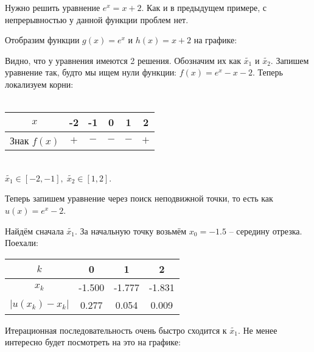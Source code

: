 \documentclass[../main.tex]{subfile}
\begin{document}
\begin{example}
	Нужно решить уравнение \(e^x=x+2.\) Как и в предыдущем примере, с
	непрерывностью у данной функции проблем нет.
	\newpage

	Отобразим функции $g(x)=e^x$ и $h(x)=x+2$ на графике:

	{\makeatletter
	\let\par\@@par
	\par{}
	\everypar{}
	\begin{wrapfigure}{l}{0.45\textwidth}
		
	\end{wrapfigure}

	Видно, что у уравнения имеются 2 решения. Обозначим их как
	$\widetilde{x_1}$ и $\widetilde{x_2}$. Запишем уравнение так, будто мы
	ищем нули функции: $f(x) = e^x-x-2$. Теперь локализуем корни:\\\\
	\begin{tabular}{ *{6}{|c}| }
		\hline
		$x$		& -2	& -1	& 0	& 1	& 2 \\
		\hline
		Знак $f(x)$ 	& $+$	& $-$	& $-$	& $-$ 	& $+$\\
		\hline
	\end{tabular}
	\\

	$\widetilde{x_1}\in[-2,-1],\;\widetilde{x_2}\in[1,2]$.

	Теперь запишем уравнение через поиск неподвижной точки, то есть как
	$u(x)=e^x-2$.
	\par}


	Найдём сначала $\widetilde{x_1}$. За начальную точку возьмём $x_0=-1.5$ --
	середину отрезка. Поехали:

	\begin{tabular}{*{4}{|c}|}
		\hline
		$k$		& 0	& 1	& 2	\\
		\hline
		$x_k$		&-1.500	&-1.777	&-1.831	\\
		\hline
		$|u(x_k)-x_k|$	& 0.277	& 0.054	& 0.009	\\
		\hline
	\end{tabular}
	\newline

	Итерационная последовательность очень быстро сходится к $\widetilde{x_1}$.
	Не менее интересно будет посмотреть на это на графике:
	\newline

	

	\newpage


\end{example}
\end{document}
